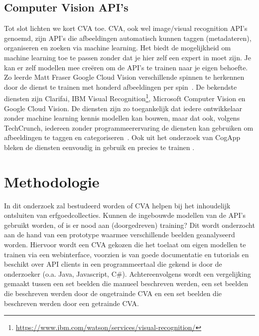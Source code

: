 \subsection{Computer Vision API's}
Tot slot lichten we kort CVA toe. CVA, ook wel image/visual recognition API's genoemd, zijn API's die afbeeldingen automatisch kunnen taggen (metadateren), organiseren en zoeken via machine learning. Het biedt de mogelijkheid om machine learning toe te passen zonder dat je hier zelf een expert in moet zijn. Je kan er zelf modellen mee cre\"{e}ren om de API's te trainen naar je eigen behoefte. Zo leerde Matt Fraser Google Cloud Vision verschillende spinnen te herkennen door de dienst te trainen met honderd afbeeldingen per spin~\autocite{Fraser2018}.  De bekendste diensten zijn Clarifai, IBM Visual Recognition\footnote{\url{https://www.ibm.com/watson/services/visual-recognition/}}, Microsoft Computer Vision en Google Cloud Vision.  De diensten zijn zo toegankelijk dat iedere ontwikkelaar zonder machine learning kennis modellen kan bouwen, maar dat ook, volgens TechCrunch, iedereen zonder programmeerervaring de diensten kan gebruiken om afbeeldingen te taggen en categoriseren~\autocite{Lardinois2018}. Ook uit het onderzoek van CogApp bleken de diensten eenvoudig in gebruik en precies te trainen \autocite{Hindle2017}.

\section{Methodologie}
\label{sec:methodologie}

In dit onderzoek zal bestudeerd worden of CVA helpen bij het inhoudelijk ontsluiten van erfgoedcollecties. Kunnen de ingebouwde modellen van de API's gebruikt worden, of is er nood aan (doorgedreven) training? Dit wordt onderzocht aan de hand van een prototype waarmee verschillende beelden geanalyseerd worden. Hiervoor wordt een CVA gekozen die het toelaat om eigen modellen te trainen via een webinterface, voorzien is van goede documentatie en tutorials en beschikt over API clients in een programmeertaal die gekend is door de onderzoeker (o.a. Java, Javascript, C\#). Achtereenvolgens wordt een vergelijking gemaakt tussen een set beelden die manueel beschreven werden, een set beelden die beschreven werden door de ongetrainde CVA en een set beelden die beschreven werden door een getrainde CVA.

